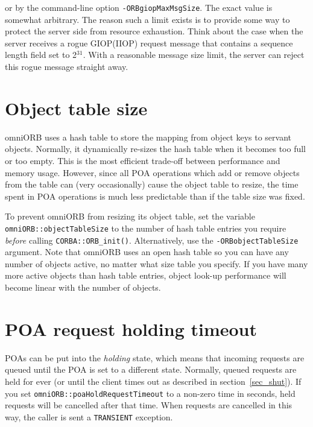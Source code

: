 \documentclass[11pt,twoside,a4paper]{book}
\newcommand{\code}[1]{\texttt{#1}}
\newcommand{\op}[1]{\texttt{#1()}}
\newcommand{\cmdline}[1]{\texttt{#1}}
\newcommand{\term}[1]{\textit{#1}}
\newcommand{\dsc}{\discretionary{}{}{}}
\begin{document}
\noindent or by the command-line option \cmdline{-ORBgiopMaxMsgSize}.
The exact value is somewhat arbitrary. The reason such a limit exists
is to provide some way to protect the server side from resource
exhaustion. Think about the case when the server receives a rogue
GIOP(IIOP) request message that contains a sequence length field set
to 2$^{31}$. With a reasonable message size limit, the server can
reject this rogue message straight away.


\section{Object table size}
\label{sec:objtable}

omniORB uses a hash table to store the mapping from object keys to
servant objects. Normally, it dynamically re-sizes the hash table when
it becomes too full or too empty. This is the most efficient trade-off
between performance and memory usage. However, since all POA
operations which add or remove objects from the table can (very
occasionally) cause the object table to resize, the time spent in POA
operations is much less predictable than if the table size was fixed.

To prevent omniORB from resizing its object table, set the variable
\code{omniORB::\dsc{}objectTableSize} to the number of hash table
entries you require \emph{before} calling \op{CORBA::\dsc{}ORB\_init}.
Alternatively, use the \cmdline{-ORBobjectTableSize} argument. Note
that omniORB uses an open hash table so you can have any number of
objects active, no matter what size table you specify. If you have
many more active objects than hash table entries, object look-up
performance will become linear with the number of objects.


\section{POA request holding timeout}

POAs can be put into the \term{holding} state, which means that
incoming requests are queued until the POA is set to a different
state. Normally, queued requests are held for ever (or until the
client times out as described in section~\ref{sec_shut}). If you set
\code{omniORB::poaHoldRequestTimeout} to a non-zero time in seconds,
held requests will be cancelled after that time. When requests are
cancelled in this way, the caller is sent a \code{TRANSIENT}
exception.
\end{document}
